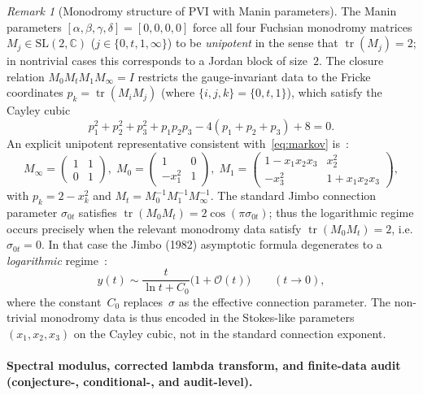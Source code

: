 \documentclass[11pt,a4paper]{article}
\theoremstyle{plain}
\theoremstyle{definition}
\theoremstyle{remark}
\newtheorem{remark}[theorem]{Remark}
\DeclareMathOperator{\tr}{tr}
\newcommand{\CC}{\mathbb{C}}
\newcommand{\Oo}{\mathcal{O}}
\begin{document}
\begin{remark}[Monodromy structure of PVI with Manin parameters]
\label{rem:unipotent}
The Manin parameters $[\alpha,\beta,\gamma,\delta] = [0,0,0,0]$
force all four Fuchsian monodromy matrices $M_j \in \mathrm{SL}(2,\CC)$
($j \in \{0,t,1,\infty\}$) to be \emph{unipotent} in the sense that
$\tr(M_j) = 2$; in nontrivial cases this corresponds to a Jordan block of
size~$2$.
The closure relation $M_0 M_t M_1 M_\infty = I$ restricts
the gauge-invariant data to the Fricke coordinates
$p_k = \tr(M_i M_j)$ (where $\{i,j,k\} = \{0,t,1\}$),
which satisfy the Cayley cubic
\begin{equation}\label{eq:markov}
  p_1^2 + p_2^2 + p_3^2 + p_1 p_2 p_3
  - 4(p_1 + p_2 + p_3) + 8 = 0.
\end{equation}
An explicit unipotent representative consistent with~\eqref{eq:markov}
is~\cite{Jim82}:
\[
  M_\infty = \begin{pmatrix} 1 & 1 \\ 0 & 1 \end{pmatrix},\;
  M_0 = \begin{pmatrix} 1 & 0 \\ -x_1^2 & 1 \end{pmatrix},\;
  M_1 = \begin{pmatrix} 1-x_1 x_2 x_3 & x_2^2 \\
    -x_3^2 & 1+x_1 x_2 x_3 \end{pmatrix},
\]
with $p_k = 2 - x_k^2$ and $M_t = M_0^{-1}M_1^{-1}M_\infty^{-1}$.
%
The standard Jimbo connection parameter
$\sigma_{0t}$ satisfies $\tr(M_0 M_t) = 2\cos(\pi\sigma_{0t})$;
thus the logarithmic regime occurs precisely when the relevant monodromy
data satisfy $\tr(M_0 M_t)=2$, i.e. $\sigma_{0t}=0$.
In that case the Jimbo (1982) asymptotic formula degenerates to
a \emph{logarithmic} regime~\cite{Jim82}:
\begin{equation}\label{eq:jimbo-log}
  y(t) \sim \frac{t}{\ln t + C_0}\bigl(1 + \Oo(t)\bigr)
  \qquad (t \to 0),
\end{equation}
where the constant~$C_0$ replaces~$\sigma$ as the effective
connection parameter.
The non-trivial monodromy data is thus encoded in
the Stokes-like parameters $(x_1, x_2, x_3)$ on the
Cayley cubic, not in the standard connection exponent.
\end{remark}

\paragraph{Spectral modulus, corrected lambda transform, and
  finite-data audit (conjecture-, conditional-, and audit-level).}
\end{document}
